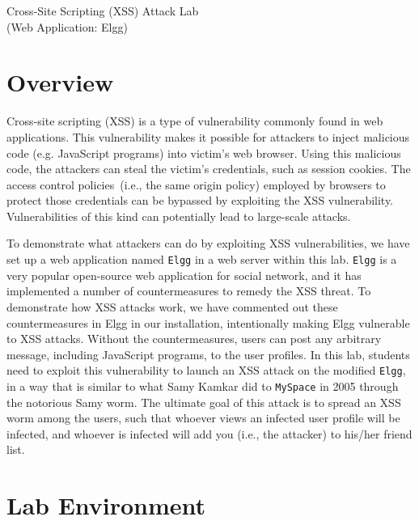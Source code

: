 
\usepackage{float}



\begin{center}
{\LARGE Cross-Site Scripting (XSS) Attack Lab}
\vspace{0.1in}\\
{\Large (Web Application: Elgg)}
\end{center}
\copyrightnotice

\section{Overview}

Cross-site scripting (XSS) is a type of vulnerability commonly found
in web applications.  This vulnerability makes it possible for
attackers to inject malicious code (e.g. JavaScript programs) into victim's
web browser. Using this malicious code, the attackers can steal the
victim's credentials, such as session cookies.  The access control 
policies~(i.e., the same origin policy) employed by browsers to protect
those credentials can be bypassed by exploiting the XSS vulnerability.
Vulnerabilities of this kind can potentially lead to large-scale
attacks.

To demonstrate what attackers can do by exploiting XSS
vulnerabilities, we have set up a web application named 
{\tt Elgg} in a web server within this lab.
{\tt Elgg} is a very popular open-source web application for
social network, and it has implemented a number of countermeasures 
to remedy the XSS threat. To demonstrate how XSS attacks work, we 
have commented out these countermeasures in Elgg in our installation, 
intentionally making Elgg vulnerable to XSS attacks.  
Without the countermeasures, users 
can post any arbitrary message, including JavaScript
programs, to the user profiles.  
In this lab, students need to exploit this vulnerability to 
launch an XSS attack on the modified {\tt Elgg}, in a way that is 
similar to what Samy Kamkar
did to {\tt MySpace} in 2005 through the notorious Samy worm. 
The ultimate goal of this attack is to spread an XSS worm among the users,
such that whoever views an infected user profile will be infected,
and whoever is infected will add you (i.e., the attacker) to 
his/her friend list. 



\section{Lab Environment}

